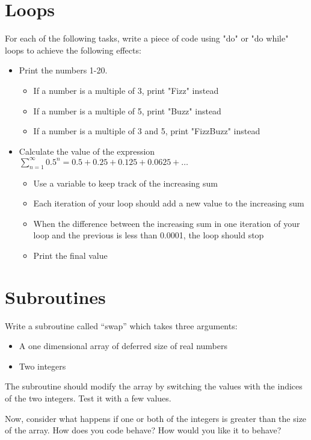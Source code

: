 \documentclass[11pt,a4paper]{article}
\begin{document}
\section{Loops}
For each of the following tasks, write a piece of code using "do" or "do while" loops to achieve the following effects:
\begin{itemize}
    \item Print the numbers 1-20.
    \begin{itemize}
        \item If a number is a multiple of 3, print "Fizz" instead
        \item If a number is a multiple of 5, print "Buzz" instead
        \item If a number is a multiple of 3 and 5, print "FizzBuzz" instead
    \end{itemize}
    \item Calculate the value of the expression $\sum\limits_{n=1}^{\infty}0.5^{n} = 0.5+0.25+0.125+0.0625+\hdots$
    \begin{itemize}
        \item Use a variable to keep track of the increasing sum
        \item Each iteration of your loop should add a new value to the increasing sum
        \item When the difference between the increasing sum in one iteration of your loop and the previous is less than 0.0001, the loop should stop
        \item Print the final value
    \end{itemize}
\end{itemize}

\section{Subroutines}
Write a subroutine called ``swap'' which takes three arguments:

\begin{itemize}
    \item A one dimensional array of deferred size of real numbers
    \item Two integers
\end {itemize}

The subroutine should modify the array by switching the values with the indices of the two integers. Test it with a few values.

Now, consider what happens if one or both of the integers is greater than the size of the array. How does you code behave? How would you like it to behave?
\end{document}
